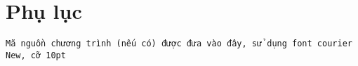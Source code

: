 \section*{Phụ lục}
\texttt{\fontsize{10pt}{0pt}\selectfont Mã nguồn chương trình (nếu có) được đưa vào đây, sử dụng font courier New, cỡ 10pt }